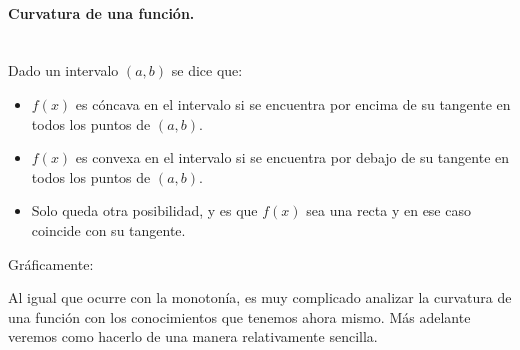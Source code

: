 \documentclass[a4paper,11pt,answers]{exam}
\begin{document}
\paragraph{Curvatura de una función.}\mbox{}\\
Dado un intervalo $(a, b)$ se dice que:
\begin{itemize}
	\item $f(x)$ es cóncava en el intervalo si se encuentra por encima de su tangente en todos los puntos de $(a,b)$.
	\item $f(x)$ es convexa en el intervalo si se encuentra por debajo de su tangente en todos los puntos de $(a,b)$.
	\item Solo queda otra posibilidad, y es que $f(x)$ sea una recta y en ese caso coincide con su tangente.
\end{itemize}

Gráficamente:
\begin{center}
\hspace{1cm}
\end{center}

Al igual que ocurre con la monotonía, es muy complicado analizar la curvatura de una función con los conocimientos que tenemos ahora mismo. Más adelante veremos como hacerlo de una manera relativamente sencilla.
\end{document}
